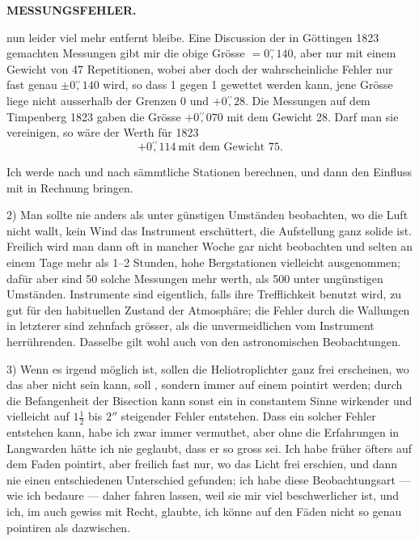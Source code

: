 \par\clearpage
\noindent\null\hfill{\small\textbf{MESSUNGSFEHLER.}}\hfill{}\par\medskip
\noindent nun leider viel mehr entfernt bleibe. Eine Discussion der in Göttingen 1823 gemachten Messungen gibt mir die obige Grösse $=0\overset{\prime\prime}{,}140$, aber nur mit einem Gewicht von 47 Repetitionen, wobei aber doch der wahrscheinliche Fehler nur fast genau $\pm0\overset{\prime\prime}{,}140$ wird, so dass 1 gegen 1 gewettet werden kann, jene Grösse liege nicht ausserhalb der Grenzen $0$ und $+0\overset{\prime\prime}{,}28$. Die Messungen auf dem Timpenberg 1823 gaben die Grösse $+0\overset{\prime\prime}{,}070$ mit dem Gewicht 28. Darf man sie vereinigen, so wäre der Werth für 1823
\[
+0\overset{\prime\prime}{,}114\ \text{mit dem Gewicht }75.
\]
\par\noindent\hspace*{\parindent}Ich werde nach und nach sämmtliche Stationen berechnen, und dann den Einfluss mit in Rechnung bringen.

\par\noindent\hspace*{\parindent}2) Man sollte nie anders als unter günstigen Umständen beobachten, wo die Luft nicht wallt, kein Wind das Instrument erschüttert, die Aufstellung ganz solide ist. Freilich wird man dann oft in mancher Woche gar nicht beobachten und selten an einem Tage mehr als 1--2 Stunden, hohe Bergstationen vielleicht ausgenommen; dafür aber sind 50 solche Messungen mehr werth, als 500 unter ungünstigen Umständen.  Instrumente sind eigentlich, falls ihre Trefflichkeit  benutzt wird, zu gut für den habituellen Zustand der Atmosphäre; die Fehler durch die Wallungen in letzterer sind zehnfach grösser, als die unvermeidlichen vom Instrument herrührenden. Dasselbe gilt wohl auch von den astronomischen Beobachtungen.

\par\noindent\hspace*{\parindent}3) Wenn es irgend möglich ist, sollen die Heliotroplichter ganz frei erscheinen, wo das aber nicht sein kann, soll , sondern immer auf einem pointirt werden; durch die Befangenheit der Bisection kann sonst ein in constantem Sinne wirkender und vielleicht auf $1\frac12$ bis $2''$ steigender Fehler entstehen. Dass ein solcher Fehler entstehen kann, habe ich zwar immer vermuthet, aber ohne die Erfahrungen in Langwarden hätte ich nie geglaubt, dass er so gross sei. Ich habe früher öfters auf dem Faden pointirt, aber freilich fast nur, wo das Licht frei erschien, und dann nie einen entschiedenen Unterschied gefunden; ich habe diese Beobachtungsart --- wie ich  bedaure --- daher fahren lassen, weil sie mir viel beschwerlicher ist, und ich, im  auch gewiss mit Recht, glaubte, ich könne auf den Fäden nicht so genau pointiren als dazwischen.

